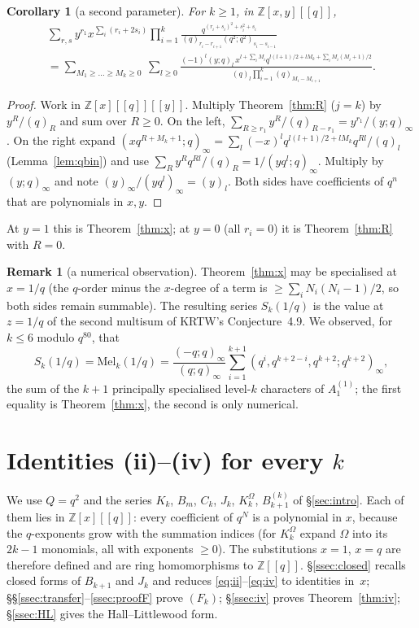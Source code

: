 \documentclass[11pt]{amsart}
\newtheorem{corollary}[theorem]{Corollary}
\theoremstyle{definition}
\newtheorem{remark}[theorem]{Remark}
\numberwithin{equation}{section}
\newcommand{\Z}{\mathbb{Z}}
\newcommand{\Mel}{\mathrm{Mel}}
\begin{document}
\begin{corollary}[a second parameter]\label{cor:y}
For $k\ge1$, in $\Z[x,y][[q]]$,
\begin{multline*}
\sum_{r,s}y^{r_1}x^{\sum_i(r_i+2s_i)}\prod_{i=1}^k\frac{q^{(r_i+s_i)^2+s_i^2+s_i}}{(q)_{r_i-r_{i+1}}(q^2;q^2)_{s_i-s_{i-1}}}\\
=\sum_{M_1\ge\dots\ge M_k\ge0}\ \sum_{l\ge0}\frac{(-1)^l(y;q)_l\,x^{l+\sum_iM_i}q^{l(l+1)/2+lM_k+\sum_iM_i(M_i+1)/2}}{(q)_l\prod_{i=1}^k(q)_{M_i-M_{i+1}}} .
\end{multline*}
\end{corollary}
\begin{proof}
Work in $\Z[x][[q]][[y]]$. Multiply Theorem~\ref{thm:R} ($j=k$) by $y^R/(q)_R$ and sum over $R\ge0$. On
the left, $\sum_{R\ge r_1}y^R/(q)_{R-r_1}=y^{r_1}/(y;q)_\infty$. On the right expand
$(xq^{R+M_k+1};q)_\infty=\sum_l(-x)^lq^{l(l+1)/2+lM_k}q^{Rl}/(q)_l$ (Lemma~\ref{lem:qbin}) and use
$\sum_Ry^Rq^{Rl}/(q)_R=1/(yq^l;q)_\infty$. Multiply by $(y;q)_\infty$ and note
$(y)_\infty/(yq^l)_\infty=(y)_l$. Both sides have coefficients of $q^n$ that are polynomials in $x,y$.
\end{proof}
At $y=1$ this is Theorem~\ref{thm:x}; at $y=0$ (all $r_i=0$) it is Theorem~\ref{thm:R} with $R=0$.

\begin{remark}[a numerical observation]\label{rem:X1}
Theorem~\ref{thm:x} may be specialised at $x=1/q$ (the $q$-order minus the $x$-degree of a term is
$\ge\sum_iN_i(N_i-1)/2$, so both sides remain summable). The resulting series $S_k(1/q)$ is the value at
$z=1/q$ of the second multisum of KRTW's Conjecture~4.9. We observed, for $k\le6$ modulo $q^{80}$, that
\[
S_k(1/q)=\Mel_k(1/q)=\frac{(-q;q)_\infty}{(q;q)_\infty}\sum_{i=1}^{k+1}(q^i,q^{k+2-i},q^{k+2};q^{k+2})_\infty,
\]
the sum of the $k+1$ principally specialised level-$k$ characters of $A_1^{(1)}$; the first equality is
Theorem~\ref{thm:x}, the second is only numerical.
\end{remark}

\section{Identities (ii)--(iv) for every \texorpdfstring{$k$}{k}}\label{sec:k3}

We use $Q=q^2$ and the series $K_k$, $B_m$, $C_k$, $J_k$, $K^\Omega_k$, $B^{(k)}_{k+1}$ of §\ref{sec:intro}. Each of
them lies in $\Z[x][[q]]$: every coefficient of $q^N$ is a polynomial in $x$, because the $q$-exponents grow with
the summation indices (for $K^\Omega_k$ expand $\Omega$ into its $2k-1$ monomials, all with exponents $\ge0$). The
substitutions $x=1$, $x=q$ are therefore defined and are ring homomorphisms to $\Z[[q]]$.
§\ref{ssec:closed} recalls closed forms of $B_{k+1}$ and $J_k$ and reduces \eqref{eq:ii}--\eqref{eq:iv} to
identities in~$x$; §§\ref{ssec:transfer}--\ref{ssec:proofF} prove $(F_k)$; §\ref{ssec:iv} proves
Theorem~\ref{thm:iv}; §\ref{ssec:HL} gives the Hall--Littlewood form.
\end{document}

